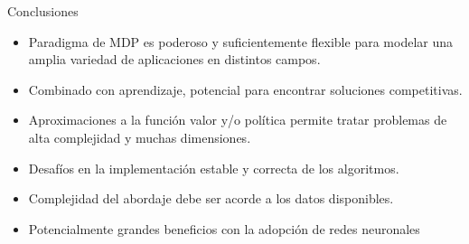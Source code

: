 \documentclass[handout]{beamer}
\begin{document}
\begin{frame}{Conclusiones}
\begin{itemize}
\item Paradigma de MDP es poderoso y suficientemente flexible para modelar una amplia variedad de aplicaciones en distintos campos.
\item<2-> Combinado con aprendizaje, potencial para encontrar soluciones competitivas.
\item<3-> Aproximaciones a la función valor y/o política permite tratar problemas de alta complejidad y muchas dimensiones.
\item<4-> Desafíos en la implementación estable y correcta de los algoritmos.
\item<5-> Complejidad del abordaje debe ser acorde a los datos disponibles.
\item<6-> Potencialmente grandes beneficios con la adopción de redes neuronales
\end{itemize}
\end{frame}
\end{document}

